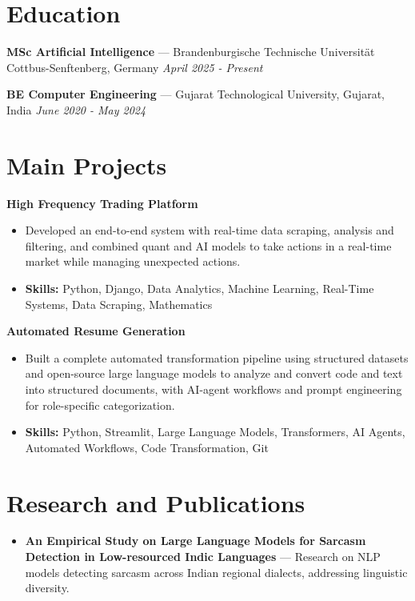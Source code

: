 \documentclass[a4paper,10pt]{article}
\begin{document}
\section*{Education}
\textbf{MSc Artificial Intelligence} — Brandenburgische Technische Universität Cottbus-Senftenberg, Germany \hfill \textit{April 2025 - Present}\par
\vspace{1.5pt}
\textbf{BE Computer Engineering} — Gujarat Technological University, Gujarat, India \hfill \textit{June 2020 - May 2024}\par

\section*{Main Projects}
\textbf{High Frequency Trading Platform}\par
\vspace{1pt}
\begin{itemize}
  \item Developed an end-to-end system with real-time data scraping, analysis and filtering, and combined quant and AI models to take actions in a real-time market while managing unexpected actions.
  \item \textbf{Skills:} Python, Django, Data Analytics, Machine Learning, Real-Time Systems, Data Scraping, Mathematics
\end{itemize}
\vspace{3pt}
\textbf{Automated Resume Generation}\par
\vspace{1pt}
\begin{itemize}
  \item Built a complete automated transformation pipeline using structured datasets and open-source large language models to analyze and convert code and text into structured documents, with AI-agent workflows and prompt engineering for role-specific categorization.
  \item \textbf{Skills:} Python, Streamlit, Large Language Models, Transformers, AI Agents, Automated Workflows, Code Transformation, Git
\end{itemize}

\section*{Research and Publications}
\begin{itemize}
\item \textbf{An Empirical Study on Large Language Models for Sarcasm Detection in Low-resourced Indic Languages} — Research on NLP models detecting sarcasm across Indian regional dialects, addressing linguistic diversity.
\end{itemize}
\end{document}
